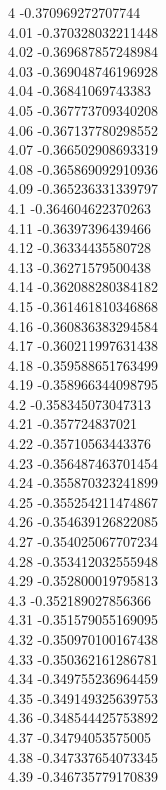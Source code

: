 {4	-0.370969272707744\\
4.01	-0.370328032211448\\
4.02	-0.369687857248984\\
4.03	-0.369048746196928\\
4.04	-0.36841069743383\\
4.05	-0.367773709340208\\
4.06	-0.367137780298552\\
4.07	-0.366502908693319\\
4.08	-0.365869092910936\\
4.09	-0.365236331339797\\
4.1	-0.364604622370263\\
4.11	-0.36397396439466\\
4.12	-0.36334435580728\\
4.13	-0.36271579500438\\
4.14	-0.362088280384182\\
4.15	-0.361461810346868\\
4.16	-0.360836383294584\\
4.17	-0.360211997631438\\
4.18	-0.359588651763499\\
4.19	-0.358966344098795\\
4.2	-0.358345073047313\\
4.21	-0.357724837021\\
4.22	-0.35710563443376\\
4.23	-0.356487463701454\\
4.24	-0.355870323241899\\
4.25	-0.355254211474867\\
4.26	-0.354639126822085\\
4.27	-0.354025067707234\\
4.28	-0.353412032555948\\
4.29	-0.352800019795813\\
4.3	-0.352189027856366\\
4.31	-0.351579055169095\\
4.32	-0.350970100167438\\
4.33	-0.350362161286781\\
4.34	-0.349755236964459\\
4.35	-0.349149325639753\\
4.36	-0.348544425753892\\
4.37	-0.34794053575005\\
4.38	-0.347337654073345\\
4.39	-0.346735779170839\\
}
